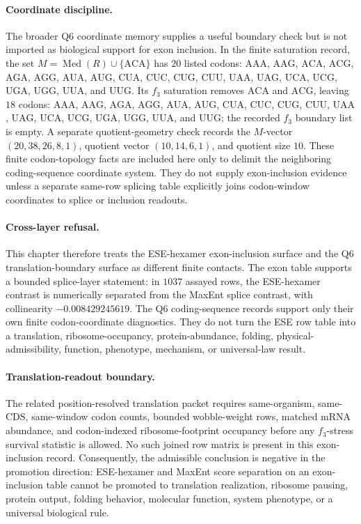\paragraph{Coordinate discipline.}
The broader Q6 coordinate memory supplies a useful boundary check but is not imported as biological support for exon inclusion.  In the finite saturation record, the set $M=\operatorname{Med}(R)\cup\{\mathrm{ACA}\}$ has $20$ listed codons:
$\mathrm{AAA}$, $\mathrm{AAG}$, $\mathrm{ACA}$, $\mathrm{ACG}$, $\mathrm{AGA}$, $\mathrm{AGG}$, $\mathrm{AUA}$, $\mathrm{AUG}$, $\mathrm{CUA}$, $\mathrm{CUC}$, $\mathrm{CUG}$, $\mathrm{CUU}$, $\mathrm{UAA}$, $\mathrm{UAG}$, $\mathrm{UCA}$, $\mathrm{UCG}$, $\mathrm{UGA}$, $\mathrm{UGG}$, $\mathrm{UUA}$, and $\mathrm{UUG}$.  Its $f_3$ saturation removes $\mathrm{ACA}$ and $\mathrm{ACG}$, leaving $18$ codons:
$\mathrm{AAA}$, $\mathrm{AAG}$, $\mathrm{AGA}$, $\mathrm{AGG}$, $\mathrm{AUA}$, $\mathrm{AUG}$, $\mathrm{CUA}$, $\mathrm{CUC}$, $\mathrm{CUG}$, $\mathrm{CUU}$, $\mathrm{UAA}$, $\mathrm{UAG}$, $\mathrm{UCA}$, $\mathrm{UCG}$, $\mathrm{UGA}$, $\mathrm{UGG}$, $\mathrm{UUA}$, and $\mathrm{UUG}$; the recorded $f_3$ boundary list is empty.  A separate quotient-geometry check records the $M$-vector $(20,38,26,8,1)$, quotient vector $(10,14,6,1)$, and quotient size $10$.  These finite codon-topology facts are included here only to delimit the neighboring coding-sequence coordinate system.  They do not supply exon-inclusion evidence unless a separate same-row splicing table explicitly joins codon-window coordinates to splice or inclusion readouts.

\paragraph{Cross-layer refusal.}
This chapter therefore treats the ESE-hexamer exon-inclusion surface and the Q6 translation-boundary surface as different finite contacts.  The exon table supports a bounded splice-layer statement: in $1037$ assayed rows, the ESE-hexamer contrast is numerically separated from the MaxEnt splice contrast, with collinearity $-0.008429245619$.  The Q6 coding-sequence records support only their own finite codon-coordinate diagnostics.  They do not turn the ESE row table into a translation, ribosome-occupancy, protein-abundance, folding, physical-admissibility, function, phenotype, mechanism, or universal-law result.

\paragraph{Translation-readout boundary.}
The related position-resolved translation packet requires same-organism, same-CDS, same-window codon counts, bounded wobble-weight rows, matched mRNA abundance, and codon-indexed ribosome-footprint occupancy before any $f_3$-stress survival statistic is allowed.  No such joined row matrix is present in this exon-inclusion record.  Consequently, the admissible conclusion is negative in the promotion direction: ESE-hexamer and MaxEnt score separation on an exon-inclusion table cannot be promoted to translation realization, ribosome pausing, protein output, folding behavior, molecular function, system phenotype, or a universal biological rule.

